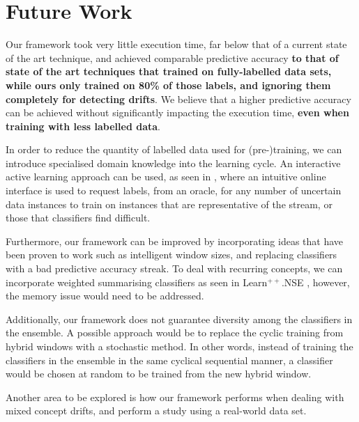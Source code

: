 
\section{Future Work}
Our framework took very little execution time, far below that of a current state of the art technique, and achieved comparable predictive accuracy \textbf{to that of state of the art techniques that trained on fully-labelled data sets, while ours only trained on 80\% of those labels, and ignoring them completely for detecting drifts}. We believe that a higher predictive accuracy can be achieved without significantly impacting the execution time, \textbf{even when training with less labelled data}.

In order to reduce the quantity of labelled data used for (pre-)training, we can introduce specialised domain knowledge into the learning cycle. An interactive active learning approach can be used, as seen in \cite{floyd2017activetext}, where an intuitive online interface is used to request labels, from an oracle, for any number of uncertain data instances to train on instances that are representative of the stream, or those that classifiers find difficult.

Furthermore, our framework can be improved by incorporating ideas that have been proven to work such as intelligent window sizes, and replacing classifiers with a bad predictive accuracy streak. To deal with recurring concepts, we can incorporate weighted summarising classifiers as seen in Learn$^{++}$.NSE \cite{elwell2011incremental}, however, the memory issue would need to be addressed.

Additionally, our framework does not guarantee diversity among the classifiers in the ensemble. A possible approach would be to replace the cyclic training from hybrid windows with a stochastic method. In other words, instead of training the classifiers in the ensemble in the same cyclical sequential manner, a classifier would be chosen at random to be trained from the new hybrid window.

Another area to be explored is how our framework performs when dealing with mixed concept drifts, and perform a study using a real-world data set.